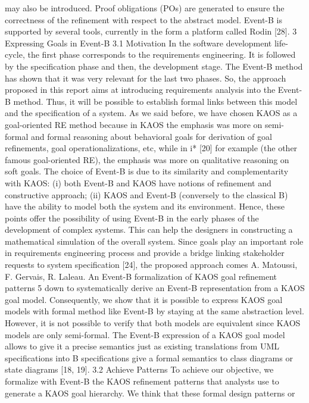 may also be introduced. Proof obligations (POs) are generated to ensure the correctness of
the refinement with respect to the abstract model. Event-B is supported by several tools,
currently in the form a platform called Rodin [28].
3 Expressing Goals in Event-B
3.1 Motivation
In the software development life-cycle, the first phase corresponds to the requirements engineering. It is followed by the specification phase and then, the development stage. The
Event-B method has shown that it was very relevant for the last two phases. So, the approach
proposed in this report aims at introducing requirements analysis into the Event-B method.
Thus, it will be possible to establish formal links between this model and the specification of
a system. As we said before, we have chosen KAOS as a goal-oriented RE method because in
KAOS the emphasis was more on semi-formal and formal reasoning about behavioral goals
for derivation of goal refinements, goal operationalizations, etc, while in i* [20] for example
(the other famous goal-oriented RE), the emphasis was more on qualitative reasoning on soft
goals. The choice of Event-B is due to its similarity and complementarity with KAOS: (i)
both Event-B and KAOS have notions of refinement and constructive approach; (ii) KAOS
and Event-B (conversely to the classical B) have the ability to model both the system and its
environment. Hence, these points offer the possibility of using Event-B in the early phases
of the development of complex systems. This can help the designers in constructing a mathematical simulation of the overall system.
Since goals play an important role in requirements engineering process and provide a
bridge linking stakeholder requests to system specification [24], the proposed approach comes
A. Matoussi, F. Gervais, R. Laleau. An Event-B formalization of KAOS goal refinement patterns 5
down to systematically derive an Event-B representation from a KAOS goal model. Consequently, we show that it is possible to express KAOS goal models with formal method like
Event-B by staying at the same abstraction level. However, it is not possible to verify that
both models are equivalent since KAOS models are only semi-formal. The Event-B expression of a KAOS goal model allows to give it a precise semantics just as existing translations
from UML specifications into B specifications give a formal semantics to class diagrams or
state diagrams [18, 19].
3.2 Achieve Patterns
To achieve our objective, we formalize with Event-B the KAOS refinement patterns that
analysts use to generate a KAOS goal hierarchy. We think that these formal design patterns or
